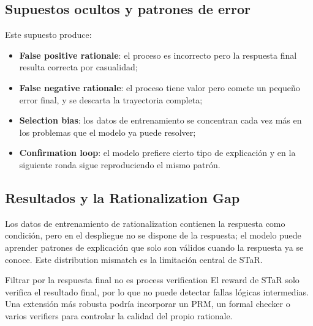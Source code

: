 \documentclass[a4paper]{article}
\begin{document}
\subsection{Supuestos ocultos y patrones de error}


Este supuesto produce:

\begin{itemize}
    \item \textbf{False positive rationale}: el proceso es incorrecto pero la respuesta final resulta correcta por casualidad;
    \item \textbf{False negative rationale}: el proceso tiene valor pero comete un pequeño error final, y se descarta la trayectoria completa;
    \item \textbf{Selection bias}: los datos de entrenamiento se concentran cada vez más en los problemas que el modelo ya puede resolver;
    \item \textbf{Confirmation loop}: el modelo prefiere cierto tipo de explicación y en la siguiente ronda sigue reproduciendo el mismo patrón.
\end{itemize}

\subsection{Resultados y la Rationalization Gap}



Los datos de entrenamiento de rationalization contienen la respuesta como condición, pero en el despliegue no se dispone de la respuesta; el modelo puede aprender patrones de explicación que solo son válidos cuando la respuesta ya se conoce. Este distribution mismatch es la limitación central de STaR.

\begin{warningbox}{Filtrar por la respuesta final no es process verification}
El reward de STaR solo verifica el resultado final, por lo que no puede detectar fallas lógicas intermedias. Una extensión más robusta podría incorporar un PRM, un formal checker o varios verifiers para controlar la calidad del propio rationale.
\end{warningbox}
\end{document}
